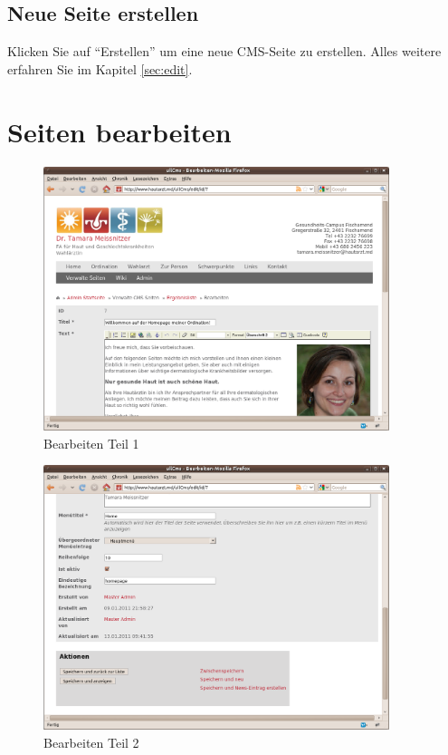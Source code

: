 \documentclass[article, a4paper, oneside, 11pt]{memoir}
\begin{document}
\subsection{Neue Seite erstellen}

Klicken Sie auf "`Erstellen"' um eine neue CMS-Seite zu erstellen. Alles weitere erfahren Sie im Kapitel \vref{sec:edit}.


\section{Seiten bearbeiten}
\label{sec:edit}

\begin{figure}[htp]
\centering
\includegraphics[width=0.9\textwidth]{edit1}
\caption{Bearbeiten Teil 1}
\label{fig:edit1}
\end{figure}

\begin{figure}[htp]
\centering
\includegraphics[width=0.9\textwidth]{edit2}
\caption{Bearbeiten Teil 2}
\label{fig:edit2}
\end{figure}
\end{document}
